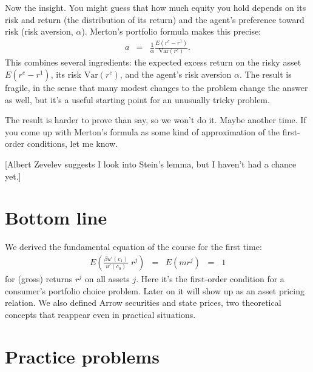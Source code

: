 \documentclass[11pt]{article}
\begin{document}
Now the insight.  You might guess that how much equity you hold
depends on its risk and return (the distribution of its return)
and the agent's preference toward risk (risk aversion, $\alpha$).
Merton's portfolio formula makes this precise:
\begin{eqnarray*}
    a &=& \frac{1}{\alpha} \frac{E (r^e - r^1)}{\mbox{Var}(r^e)} .
\end{eqnarray*}
This combines several ingredients:
the expected excess return on the risky asset $E (r^e - r^1)$,
its risk $\mbox{Var}(r^e)$,
and the agent's risk aversion $\alpha$.
The result is fragile, in the sense that many modest changes to the problem
change the answer as well,
but it's a useful starting point for an unusually tricky problem.

The result is harder to prove than say, so we won't do it.
Maybe another time.
If you come up with Merton's formula as some kind of approximation
of the first-order conditions, let me know.

[Albert Zevelev suggests I look into Stein's lemma, but I haven't
had a chance yet.]

\begin{comment}
Merton derived it in continuous time using a set of tools
we will diligently avoid.
Here we might start with the lognormal assumption.
Let us say that $x = \log r^e - \log r^1 \sim \mathcal{N}(\kappa_1,\kappa_2)$.
Then $r^e = r^1 e^x$ and
$r^e-r^1 = r^1 (e^x-1)$.
\end{comment}


\section*{Bottom line}

We derived the fundamental equation of the course for the first time:
\begin{eqnarray*}
    E \left( \frac{\beta u'(c_1)}{u'(c_0)}\; r^j \right) &=&
        E \left( m r^j \right) \;\;=\;\;  1
\end{eqnarray*}
for (gross) returns $r^j$ on all assets $j$.
Here it's the first-order condition for a consumer's portfolio choice
problem.
Later on it will show up as an asset pricing relation.
We also defined Arrow securities and state prices,
two theoretical concepts that reappear even in practical
situations.


\section*{Practice problems}
\end{document}
